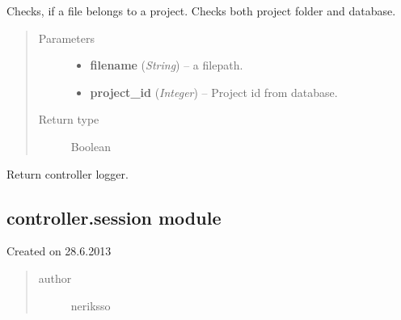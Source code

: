 \documentclass[letterpaper,10pt,english]{sphinxmanual}
\begin{document}
\begin{fulllineitems}
\label{controller:controller.project.is_project_file}
Checks, if a file belongs to a project. Checks both project folder
and database.
\begin{quote}\begin{description}
\item[{Parameters}] \leavevmode\begin{itemize}
\item {} 
\textbf{filename} (\emph{String}) -- a filepath.

\item {} 
\textbf{project\_id} (\emph{Integer}) -- Project id from database.

\end{itemize}

\item[{Return type}] \leavevmode
Boolean

\end{description}\end{quote}

\end{fulllineitems}


\begin{fulllineitems}
\label{controller:controller.project.logger}
Return controller logger.

\end{fulllineitems}



\subsection{controller.session module}
\label{controller:module-controller.session}\label{controller:controller-session-module}
Created on 28.6.2013
\begin{quote}\begin{description}
\item[{author}] \leavevmode
neriksso

\end{description}\end{quote}
\end{document}
